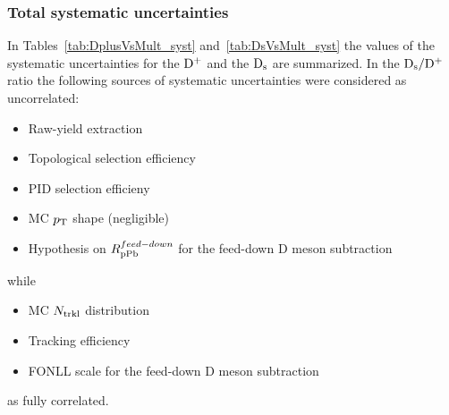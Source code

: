 \subsubsection{Total systematic uncertainties}
In Tables~\ref{tab:DplusVsMult_syst} and~\ref{tab:DsVsMult_syst} the values of the systematic uncertainties for the ${\rm D^+}$ and the ${\rm D_s}$ are summarized.
In the ${\rm D_s}/{\rm D^+}$ ratio the following sources of systematic uncertainties were considered as uncorrelated:
\begin{itemize}
\item Raw-yield extraction
\item Topological selection efficiency
\item PID selection efficieny
\item MC $p_{\rm T}$ shape (negligible)
\item Hypothesis on $R_{\rm pPb}^{feed-down}$ for the feed-down D meson subtraction
\end{itemize} 
while
\begin{itemize}
\item MC $N_{\rm trkl}$ distribution
\item Tracking efficiency
\item FONLL scale for the feed-down D meson subtraction
\end{itemize} 
as fully correlated.

